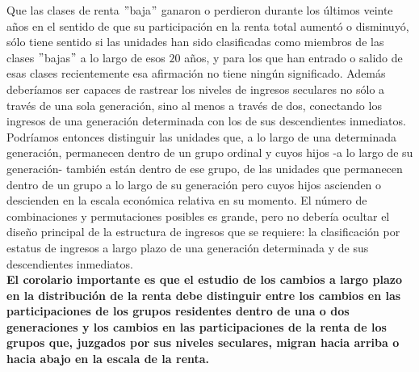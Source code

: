 Que las clases de renta $"$baja$"$ ganaron o perdieron durante los últimos veinte años en el sentido de que su participación en la renta total aumentó o disminuyó, sólo tiene sentido si las unidades han sido clasificadas como miembros de las clases $"$bajas$"$ a lo largo de esos $20$ años, y para los que han entrado o salido de esas clases recientemente esa afirmación no tiene ningún significado. Además deberíamos ser capaces de rastrear los niveles de ingresos seculares no sólo a través de una sola generación, sino al menos a través de dos, conectando los ingresos de una generación determinada con los de sus descendientes inmediatos. Podríamos entonces distinguir las unidades que, a lo largo de una determinada generación, permanecen dentro de un grupo ordinal y cuyos hijos -a lo largo de su generación- también están dentro de ese grupo, de las unidades que permanecen dentro de un grupo a lo largo de su generación pero cuyos hijos ascienden o descienden en la escala económica relativa en su momento. El número de combinaciones y permutaciones posibles es grande, pero no debería ocultar el diseño principal de la estructura de ingresos que se requiere: la clasificación por estatus de ingresos a largo plazo de una generación determinada y de sus descendientes inmediatos.\\

\textbf{El corolario importante es que el estudio de los cambios a largo plazo en la distribución de la renta debe distinguir entre los cambios en las participaciones de los grupos residentes dentro de una o dos generaciones y los cambios en las participaciones de la renta de los grupos que, juzgados por sus niveles seculares, migran hacia arriba o hacia abajo en la escala de la renta.}

